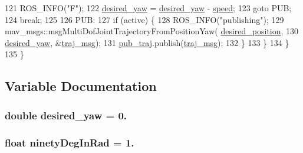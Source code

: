 \begin{DoxyCode}
121         ROS\_INFO(\textcolor{stringliteral}{"F"});
122         \hyperlink{oculus-control-keyboard_8cpp_a03a69ef33d756512293e67791ab5f265}{desired\_yaw} = \hyperlink{oculus-control-keyboard_8cpp_a03a69ef33d756512293e67791ab5f265}{desired\_yaw} - \hyperlink{oculus-control-keyboard_8cpp_a7f7e4724cf57d59513b39c5ecc81adc8}{speed};
123         \textcolor{keywordflow}{goto} PUB;
124         \textcolor{keywordflow}{break};
125 
126       PUB:
127         \textcolor{keywordflow}{if} (active) \{
128           ROS\_INFO(\textcolor{stringliteral}{"publishing"});
129               mav\_msgs::msgMultiDofJointTrajectoryFromPositionYaw(
      \hyperlink{oculus-control-keyboard_8cpp_a608d9948c063034b7605598daaeccc3e}{desired\_position},
130                   \hyperlink{oculus-control-keyboard_8cpp_a03a69ef33d756512293e67791ab5f265}{desired\_yaw}, &\hyperlink{oculus-control-keyboard_8cpp_a090c0766fbb77862dd8cc0cca99d688b}{traj\_msg});
131           \hyperlink{oculus-control-keyboard_8cpp_a92b67ae724bc0d23b8e85e92e89403df}{pub\_traj}.publish(\hyperlink{oculus-control-keyboard_8cpp_a090c0766fbb77862dd8cc0cca99d688b}{traj\_msg});
132         \}
133       \}
134     \}
135 \}
\end{DoxyCode}


\subsection{Variable Documentation}
\subsubsection[{\texorpdfstring{desired\+\_\+yaw}{desired_yaw}}]{\setlength{\rightskip}{0pt plus 5cm}double desired\+\_\+yaw = 0.}\hypertarget{oculus-control-keyboard_8cpp_a03a69ef33d756512293e67791ab5f265}{}\label{oculus-control-keyboard_8cpp_a03a69ef33d756512293e67791ab5f265}
\subsubsection[{\texorpdfstring{ninety\+Deg\+In\+Rad}{ninetyDegInRad}}]{\setlength{\rightskip}{0pt plus 5cm}float ninety\+Deg\+In\+Rad = 1.}\hypertarget{oculus-control-keyboard_8cpp_a2cce9b626fdb3b1f78baad955bd5b609}{}\label{oculus-control-keyboard_8cpp_a2cce9b626fdb3b1f78baad955bd5b609}
